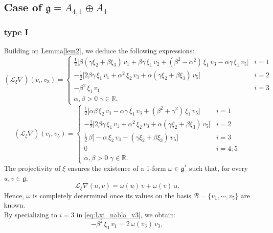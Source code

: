 \documentclass[10pt]{article}
\begin{document}
 \subsection{Case of $\mathfrak{g}=A_{4,1}\oplus A_1$}
\subsubsection{type I}
Building on Lemma\ref{lem2}, we deduce the following expressions:
\begin{equation}
(\mathscr{L}_{\xi}\nabla)(v_i, v_3) =
\begin{cases}
\displaystyle \tfrac{1}{2}\bigl[\beta(\gamma\xi_2 + \beta\xi_3)\,v_1 + \beta\gamma\,\xi_1\,v_2 + (\beta^2 - \alpha^2)\,\xi_1\,v_3 - \alpha\gamma\,\xi_1\,v_5 \bigr] & i = 1\\[0.75em]
\displaystyle -\tfrac{1}{2}\bigl[2\beta\gamma\,\xi_1\,v_1 + \alpha^2\,\xi_2\,v_3 + \alpha(\gamma\xi_2 + \beta\xi_3)\,v_5 \bigr] & i = 2\\
-\beta^2\,\xi_1\,v_1 & i = 3\\
\alpha,\beta>0\;\gamma\in\mathbb{R}.
\end{cases}
\label{eq:Lxi_nabla_v3}
\end{equation}
\begin{equation}
(\mathscr{L}_{\xi}\nabla)(v_i, v_5) =
\begin{cases}
\displaystyle \tfrac{1}{2}\bigl[\alpha\beta\,\xi_2\,v_1 - \alpha\gamma\,\xi_1\,v_3 + (\beta^2 + \gamma^2)\,\xi_1\,v_5 \bigr] & i = 1\\[0.75em]
\displaystyle -\tfrac{1}{2}\bigl[2\beta\gamma\,\xi_1\,v_1 + \alpha^2\,\xi_2\,v_3 + \alpha(\gamma\xi_2 + \beta\xi_3)\,v_5 \bigr] & i = 2\\[0.75em]
\displaystyle \tfrac{1}{2}\,\beta\bigl[-\alpha\,\xi_2\,v_3 - (\gamma\xi_2 + \beta\xi_3)\,v_5 \bigr] & i = 3\\
0 & i = 4;5\\
\alpha,\beta>0\;\gamma\in\mathbb{R}.
\end{cases}
\label{eq:Lxi_nabla_v5}
\end{equation}
The projectivity of $\xi$ ensures the existence of a 1-form $\omega \in \mathfrak{g}^*$ such that, for every $u,v\in\mathfrak{g}$,
\[
\mathscr{L}_\xi\nabla(u,v)=\omega(u)\,v+\omega(v)\,u.
\]
Hence, $\omega$ is completely determined once its values on the basis $\mathcal{B}=\{v_1,\cdots,v_5\}$ are known.\\
By specializing to \(i=3\) in \eqref{eq:Lxi_nabla_v3}, we obtain:
\[
-\beta^2\,\xi_1\,v_1 = 2\,\omega(v_3)\,v_3,
\]
\end{document}
